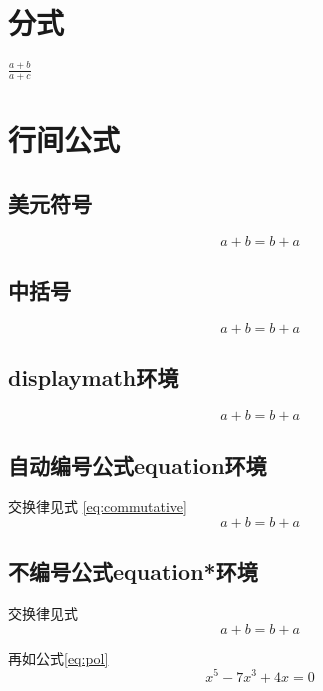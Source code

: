 \documentclass{article}		%
\begin{document}
		\section{分式}
			$\frac{a+b}{a+c}$
		\section{行间公式}
			\subsection{美元符号}
				$$a+b=b+a$$
			\subsection{中括号}
				\[a+b=b+a\]
			\subsection{displaymath环境}
				\begin{displaymath}
					a+b=b+a
				\end{displaymath}
			\subsection{自动编号公式equation环境}
				交换律见式 \ref{eq:commutative} %
				\begin{equation}
					a+b=b+a \label{eq:commutative} %
				\end{equation}
			\subsection{不编号公式equation*环境}
				交换律见式
				\begin{equation*}
					a+b=b+a
				\end{equation*}
				
				再如公式\ref{eq:pol}
				\begin{equation}
				x^5 - 7x^3 +4x = 0 \label{eq:pol}
				\end{equation}
\end{document}
